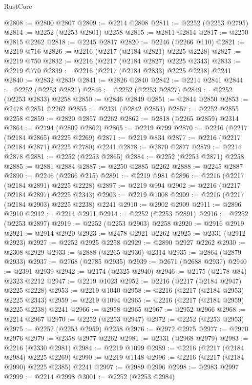 \begin{lexlean}{RustCore}
\begin{coremodule}
@2808 := @2800 @2807
@2809 := @2214 @2808
@2811 := @2252 (@2253 @2795)
@2814 := @2252 (@2253 @2801) @2258
@2815 := @2811 @2814
@2817 := @2250 @2815 @2262
@2818 := @2245 @2817
@2820 := @2246 (@2266 @110)
@2821 := @2219 @716
@2826 := @2216 (@2217 (@2184 @2821) @2225 @2228)
@2827 := @2219 @750
@2832 := @2216 (@2217 (@2184 @2827) @2225 @2343)
@2833 := @2219 @770
@2839 := @2216 (@2217 (@2184 @2833) @2225 @2238) @2241
@2840 := @2832 @2839
@2841 := @2826 @2840
@2842 := @2214 @2841
@2844 := @2252 (@2253 @2821)
@2846 := @2252 (@2253 @2827)
@2849 := @2252 (@2253 @2833) @2258
@2850 := @2846 @2849
@2851 := @2844 @2850
@2853 := @2478 @2851 @2262
@2855 := @2331 (@2842 @2853)
@2857 := @2252 @2855 @2258
@2859 := @2820 @2857 @2262
@2862 := @2818 (@2265 @2859) @2314
@2864 := @2794 (@2809 @2862)
@2865 := @2219 @799
@2870 := @2216 (@2217 (@2184 @2865) @2225 @2269)
@2871 := @2219 @834
@2877 := @2216 (@2217 (@2184 @2871) @2225 @2780) @2241
@2878 := @2870 @2877
@2879 := @2214 @2878
@2881 := @2252 (@2253 @2865)
@2884 := @2252 (@2253 @2871) @2258
@2885 := @2881 @2884
@2887 := @2250 @2885 @2262
@2888 := @2245 @2887
@2890 := @2246 (@2266 @215)
@2891 := @2219 @981
@2896 := @2216 (@2217 (@2184 @2891) @2225 @2228)
@2897 := @2219 @994
@2902 := @2216 (@2217 (@2184 @2897) @2225 @2343)
@2903 := @2219 @1008
@2909 := @2216 (@2217 (@2184 @2903) @2225 @2238) @2241
@2910 := @2902 @2909
@2911 := @2896 @2910
@2912 := @2214 @2911
@2914 := @2252 (@2253 @2891)
@2916 := @2252 (@2253 @2897)
@2919 := @2252 (@2253 @2903) @2258
@2920 := @2916 @2919
@2921 := @2914 @2920
@2923 := @2478 @2921 @2262
@2925 := @2331 (@2912 @2923)
@2927 := @2252 @2925 @2258
@2929 := @2890 @2927 @2262
@2930 := @2308 @2929
@2933 := @2888 (@2265 @2930) @2314
@2935 := @2864 (@2879 @2933)
@2937 := @2768 (@2785 @2935)
@2939 := @2671 (@2688 @2937)
@2940 := @2391 @2939
@2942 := @2174 (@2325 @2940)
@2946 := @2175 (@2178 @84) @2323 @2212
@2947 := @2219 @1023
@2952 := @2216 (@2217 (@2184 @2947) @2225 @2228)
@2953 := @2219 @1040
@2958 := @2216 (@2217 (@2184 @2953) @2225 @2343)
@2959 := @2219 @1094
@2965 := @2216 (@2217 (@2184 @2959) @2225 @2238) @2241
@2966 := @2958 @2965
@2967 := @2952 @2966
@2968 := @2214 @2967
@2970 := @2252 (@2253 @2947)
@2972 := @2252 (@2253 @2953)
@2975 := @2252 (@2253 @2959) @2258
@2976 := @2972 @2975
@2977 := @2970 @2976
@2979 := @2358 @2977 @2262
@2981 := @2331 (@2968 @2979)
@2983 := @2216 (@2330 @2981)
@2984 := @2219 @1099
@2989 := @2216 (@2217 (@2184 @2984) @2225 @2269)
@2990 := @2219 @1148
@2996 := @2216 (@2217 (@2184 @2990) @2225 @2385) @2241
@2997 := @2989 @2996
@2998 := @2983 @2997
@2999 := @2214 @2998
@3001 := @2252 (@2253 @2984)

\end{coremodule}
\end{lexlean}
